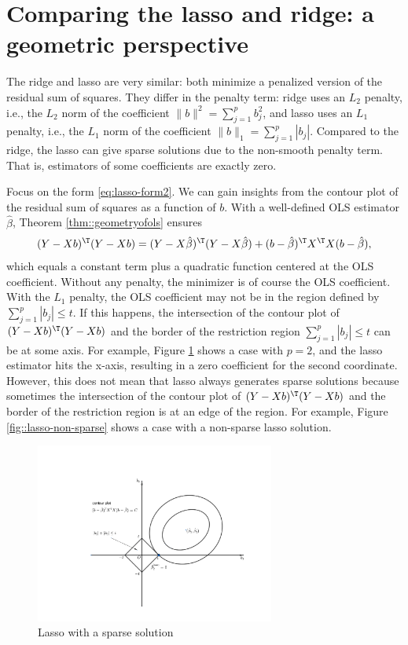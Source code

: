 \section{Comparing the lasso and ridge: a geometric perspective}


The ridge and lasso are very similar: both minimize a penalized version of the residual sum of squares. They differ in the penalty term: ridge uses an $L_2$ penalty, i.e., the $L_2$ norm of the coefficient $ \| b\|^2 =  \sum_{j=1}^p b_j^2$, and lasso uses an $L_1$ penalty, i.e., the $L_1$ norm of the coefficient   $\| b\|_1 = \sum_{j=1}^p | b_j |$. Compared to the ridge, the lasso can give sparse solutions due to the non-smooth penalty term. That is, estimators of some coefficients are exactly zero. 


Focus on the form \eqref{eq:lasso-form2}.  We can gain insights from the contour plot of the residual sum of squares as a function of $b$. With a well-defined OLS estimator $\hat{\beta}$, Theorem \ref{thm::geometryofols} ensures 
\begin{align*}
(Y-Xb)^{\T}(Y-Xb)  =(Y-X\hat{\beta})^{\T}(Y-X\hat{\beta})
  +(b-\hat{\beta})^{\T}X^{\T}X(b-\hat{\beta}),
\end{align*}
which equals a constant term plus a quadratic function centered at the OLS coefficient. Without any penalty, the minimizer is of course the OLS coefficient. With the $L_1$ penalty, the OLS coefficient may not be in the region defined by $\sum_{j=1}^{p}|b_{j}| \leq t$. If this happens, the intersection of the contour plot of $(Y-Xb)^{\T}(Y-Xb)$ and the border of the restriction region $\sum_{j=1}^{p}|b_{j}| \leq t$ can be at some axis. For example, Figure \ref{fig::lasso-sparse} shows a case with $p=2$, and the lasso estimator hits the x-axis, resulting in a zero coefficient for the second coordinate. However, this does not mean that lasso always generates sparse solutions because sometimes the intersection of the contour plot of $(Y-Xb)^{\T}(Y-Xb)$ and the border of the restriction region is at an edge of the region. For example, Figure \ref{fig::lasso-non-sparse} shows a case with a non-sparse lasso solution. 


\begin{figure}
\centering
\includegraphics[width = 0.7\textwidth]{figures/lassogeometry1.pdf}
\caption{Lasso with a sparse solution}\label{fig::lasso-sparse}
\end{figure}

